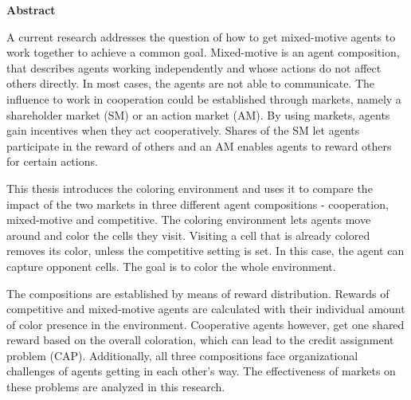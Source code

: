 \vspace*{2cm}

\begin{center}
    \textbf{Abstract}
\end{center}

\vspace*{1cm}

\noindent A current research addresses the question of how to get mixed-motive agents to work together to achieve a common goal. Mixed-motive is an agent composition, that describes agents working independently and whose actions do not affect others directly. In most cases, the agents are not able to communicate. The influence to work in cooperation could be established through markets, namely a shareholder market (SM) or an action market (AM). By using markets, agents gain incentives when they act cooperatively. Shares of the SM let agents participate in the reward of others and an AM enables agents to reward others for certain actions.

This thesis introduces the coloring environment and uses it to compare the impact of the two markets in three different agent compositions - cooperation, mixed-motive and competitive. The coloring environment lets agents move around and color the cells they visit. Visiting a cell that is already colored removes its color, unless the competitive setting is set. In this case, the agent can capture opponent cells. The goal is to color the whole environment.

The compositions are established by means of reward distribution. Rewards of competitive and mixed-motive agents are calculated with their individual amount of color presence in the environment. Cooperative agents however, get one shared reward based on the overall coloration, which can lead to the credit assignment problem (CAP). Additionally, all three compositions face organizational challenges of agents getting in each other's way. The effectiveness of markets on these problems are analyzed in this research. 